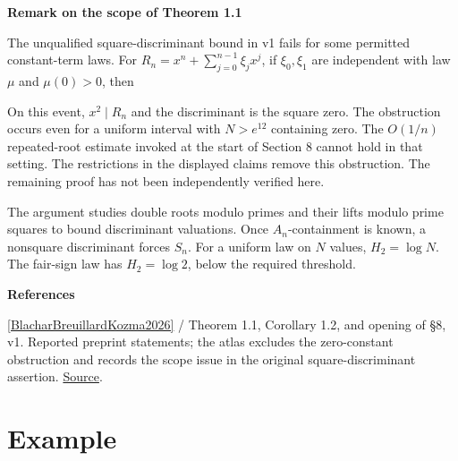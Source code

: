 \documentclass[11pt,a4paper,oneside,openany]{book}
\newcommand{\atlasdisplay}[1]{\par\begingroup\centering\vspace{3pt}\noindent\adjustbox{max width=\linewidth}{\(\displaystyle #1\)}\par\vspace{5pt}\endgroup}
\newenvironment{sources}{\par\smallskip\begingroup\footnotesize\color{atlasgray}\leftskip=10pt\setlength{\parskip}{2pt}}{\par\endgroup\smallskip}
\begin{document}
\begin{atlasblock}[standard]
\textbf{\sffamily Remark on the scope of Theorem 1.1}\par\smallskip
\color{black} The unqualified square-discriminant bound in v1 fails for some permitted constant-term laws. For \(R_n=x^n+\sum_{j=0}^{n-1}\xi_jx^j\), if \(\xi_0,\xi_1\) are independent with law \(\mu\) and \(\mu(0)>0\), then\par

\atlasdisplay{\Pr(\operatorname{disc}R_n=0)\ge\Pr(\xi_0=\xi_1=0)=\mu(0)^2.}
\color{black} On this event, \(x^2\mid R_n\) and the discriminant is the square zero. The obstruction occurs even for a uniform interval with \(N>e^{12}\) containing zero. The \(O(1/n)\) repeated-root estimate invoked at the start of Section 8 cannot hold in that setting. The restrictions in the displayed claims remove this obstruction. The remaining proof has not been independently verified here.\par
\end{atlasblock}\color{black}
\color{black} The argument studies double roots modulo primes and their lifts modulo prime squares to bound discriminant valuations. Once \(A_n\)-containment is known, a nonsquare discriminant forces \(S_n\). For a uniform law on \(N\) values, \(H_2=\log N\). The fair-sign law has \(H_2=\log2\), below the required threshold.\par
\begin{sources}
\textbf{References}\par\smallskip
\noindent\hyperlink{ref:BlacharBreuillardKozma2026}{[BlacharBreuillardKozma2026]} / Theorem 1.1, Corollary 1.2, and opening of §8, v1. Reported preprint statements; the atlas excludes the zero-constant obstruction and records the scope issue in the original square-discriminant assertion. \href{https://arxiv.org/abs/2609.40123v1}{Source}.\par
\end{sources}\color{black}
\section{Example}
\end{document}
